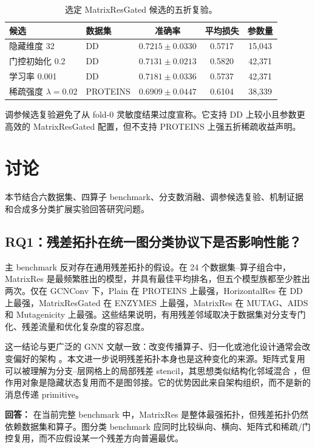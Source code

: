 \documentclass[UTF8,10pt]{ctexart}
\let\cite\citep
\begin{document}
\begin{table}[h]
\centering
\small
\caption{选定 MatrixResGated 候选的五折复验。}
\label{tab:tuned_candidates}
\begin{tabular}{l l c c c}
\toprule
候选 & 数据集 & 准确率 & 平均损失 & 参数量 \\
\midrule
隐藏维度 32 & DD & \(\mathbf{0.7215\pm0.0330}\) & 0.5717 & 15,043 \\
门控初始化 0.2 & DD & \(0.7131\pm0.0213\) & 0.5820 & 42,371 \\
学习率 0.001 & DD & \(0.7181\pm0.0336\) & 0.5737 & 42,371 \\
稀疏强度 \(\lambda=0.02\) & PROTEINS & \(0.6909\pm0.0447\) & 0.6104 & 38,339 \\
\bottomrule
\end{tabular}
\end{table}

调参候选复验避免了从 fold-0 灵敏度结果过度宣称。它支持 DD 上较小且参数更高效的 MatrixResGated 配置，但不支持 PROTEINS 上强五折稀疏收益声明。

\section{讨论}

本节结合六数据集、四算子 benchmark、分支数消融、调参候选复验、机制证据和合成多分类扩展实验回答研究问题。

\subsection{RQ1：残差拓扑在统一图分类协议下是否影响性能？}

主 benchmark 反对存在通用残差拓扑的假设。在 24 个数据集--算子组合中，MatrixRes 是最频繁胜出的模型，并具有最佳平均排名，但五个模型族都至少胜出两次。仅在 GCNConv 下，Plain 在 PROTEINS 上最强，HorizontalRes 在 DD 上最强，MatrixResGated 在 ENZYMES 上最强，MatrixRes 在 MUTAG、AIDS 和 Mutagenicity 上最强。这些结果说明，有用残差邻域取决于数据集对分支专门化、残差流量和优化复杂度的容忍度。

这一结论与更广泛的 GNN 文献一致：改变传播算子、归一化或池化设计通常会改变偏好的架构 \cite{xu2019gin,hamilton2017inductive,velivckovic2017graph,ying2018hierarchical}。本文进一步说明残差拓扑本身也是这种变化的来源。矩阵式复用可以被理解为分支--层网格上的局部残差 stencil，其思想类似结构化邻域混合 \cite{abu2019mixhop}，但作用对象是隐藏状态复用而不是图邻接。它的优势因此来自架构组织，而不是新的消息传递 primitive。

\textbf{回答：} 在当前完整 benchmark 中，MatrixRes 是整体最强拓扑，但残差拓扑仍然依赖数据集和算子。图分类 benchmark 应同时比较纵向、横向、矩阵式和稀疏/门控复用，而不应假设某一个残差方向普遍最优。
\end{document}
